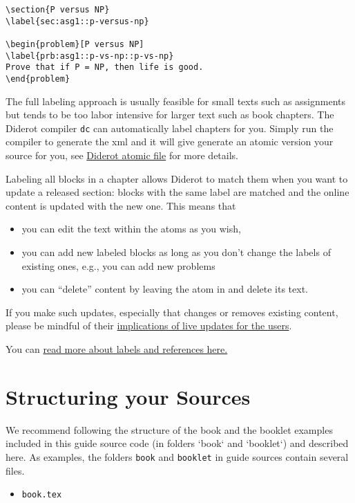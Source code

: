 \begin{note}
\begin{example}
\begin{lstlisting}
\section{P versus NP}
\label{sec:asg1::p-versus-np}

\begin{problem}[P versus NP]
\label{prb:asg1::p-vs-np::p-vs-np}
Prove that if P = NP, then life is good.
\end{problem}

\end{lstlisting}
\end{example}


\begin{important}
The full labeling approach is usually feasible for small texts such as assignments but tends to be too labor intensive for larger text such as book chapters.
%
The Diderot compiler \lstinline`dc` can  automatically label chapters for you.  Simply run the compiler to generate the xml and it will give generate an atomic version your source for you, see
 \href{grm:publisg::diderot-atomic}{Diderot atomic  file} 
%
for more details.
\end{important}

Labeling all blocks in a chapter allows Diderot to match them when you want to update a released section: blocks with the same label are matched and the online content is updated with the new one.
%
This means that 
\begin{itemize}

\item you can edit the text within the atoms as you wish,
%

\item you can add new labeled blocks as long as you don't change the labels of existing ones, e.g., you can add new problems

\item you can ``delete'' content by leaving the atom in and delete its text.
\end{itemize}
%
If you make such updates, especially that changes or removes existing content, 
please be mindful of their 
%
\href{grm:publish::released::user-implications}{implications of live updates for the users}.

\begin{note}
You can \href{sec:dc::labels-refs}{read more about labels and references here.}
\end{note}

\section{Structuring your Sources}
\label{sec:publish::latex-structure}
%
We recommend following the structure
of the book and the booklet examples included in this guide source
code (in folders `book` and `booklet`) and described here.
%
As examples, 
the folders \lstinline`book` and \lstinline`booklet` in guide sources contain several files.
%
\begin{itemize}
\item \lstinline`book.tex`


\end{itemize}
\end{note}
